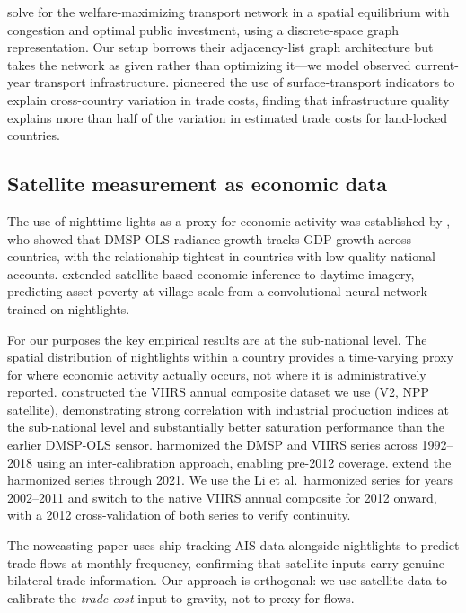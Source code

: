 \documentclass[11pt, a4paper]{article}
\begin{document}
\citet{fajgelbaum_schaal_2020} solve for the welfare-maximizing transport
network in a spatial equilibrium with congestion and optimal public investment,
using a discrete-space graph representation.
Our setup borrows their adjacency-list graph architecture but takes the network
as given rather than optimizing it---we model observed current-year transport
infrastructure.
\citet{limao_venables_2001} pioneered the use of surface-transport indicators
to explain cross-country variation in trade costs, finding that infrastructure
quality explains more than half of the variation in estimated trade costs for
land-locked countries.

\subsection{Satellite measurement as economic data}

The use of nighttime lights as a proxy for economic activity was established
by \citet{henderson_storeygard_weil_2012}, who showed that DMSP-OLS radiance
growth tracks GDP growth across countries, with the relationship tightest in
countries with low-quality national accounts.
\citet{jean_burke_xie_davis_lobell_ermon_2016} extended satellite-based
economic inference to daytime imagery, predicting asset poverty at village
scale from a convolutional neural network trained on nightlights.

For our purposes the key empirical results are at the sub-national level.
The spatial distribution of nightlights within a country provides
a time-varying proxy for where economic activity actually occurs, not where
it is administratively reported.
\citet{elvidge_zhizhin_ghosh_baugh_hsu_2021} constructed the VIIRS annual
composite dataset we use (V2, NPP satellite), demonstrating strong correlation
with industrial production indices at the sub-national level and substantially
better saturation performance than the earlier DMSP-OLS sensor.
\citet{li_zhou_zhao_zhao_2020} harmonized the DMSP and VIIRS series across
1992--2018 using an inter-calibration approach, enabling pre-2012 coverage.
\citet{ghosh_et_al_2021} extend the harmonized series through 2021.
We use the Li et al.\ harmonized series for years 2002--2011 and switch to
the native VIIRS annual composite for 2012 onward, with a 2012 cross-validation
of both series to verify continuity.

The \citet{imf_wp_25_93} nowcasting paper uses ship-tracking AIS data alongside
nightlights to predict trade flows at monthly frequency, confirming that
satellite inputs carry genuine bilateral trade information.
Our approach is orthogonal: we use satellite data to calibrate the
\emph{trade-cost} input to gravity, not to proxy for flows.
\end{document}
